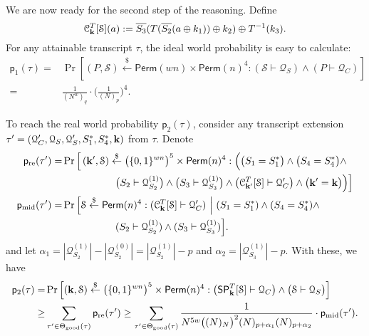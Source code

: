We are now ready for the second step of the reasoning. Define
%
$$\mathcal{C}_{\mathbf{k}}^T[\mathcal{S}](a):=   \overline{S_3}(T(\overline{S_2}(a\oplus k_1))\oplus k_2)\oplus T^{-1}(k_3).$$
%
For any attainable transcript $\tau$, the ideal world probability is easy to calculate:
%
%
\begin{align*}
\mathsf{p}_{1}(\tau)=&\operatorname{Pr}\left[(P,\mathcal{S})\stackrel{\$}{\leftarrow} {\mathsf{Perm}}(wn)\times\mathsf{Perm}(n)^4: (\mathcal{S} \vdash \mathcal{Q}_{S}) \wedge(P \vdash \mathcal{Q}_{C})  \right]		\\
=&\frac{1}{(N^w)_q}\cdot\bigg(\frac{1}{(N)_p}\bigg)^4.
\end{align*}



To reach the real world probability $\mathsf{p}_2(\tau)$, consider any transcript extension $\tau'=(\mathcal{Q}_{C}',\mathcal{Q}_{S},\mathcal{Q}_{S}',S_1^*,S_4^*,\mathbf{k})$ from $\tau$. Denote
%
%
\begin{align}
\mathsf{p}_{\mathrm{re}}(\tau') = & \operatorname{Pr}\Big[\left(\mathbf{k}',\mathcal{S}\right) \stackrel{\$}{\leftarrow} \big(\{0,1\}^{wn}\big)^5 \times \mathsf{Perm}(n)^4:
\Big(\big(S_1=S_1^*\big)\wedge\big(S_4=S_4^*\big)\wedge		\notag 	\\
&\ \ \ \ \ \ \ \ \ \ \ \ \ \ \ \ \big(S_2\vdash\mathcal{Q}_{S_2}^{(1)}\big)\wedge\big(S_3\vdash\mathcal{Q}_{S_3}^{(1)}\big)\wedge\big(\mathcal{C}_{\mathbf{k}'}^T[\mathcal{S}] \vdash \mathcal{Q}_C'\big)\wedge\big(\mathbf{k}'=\mathbf{k}\big)\Big)\Big]	 	\notag 	\\
\mathsf{p}_{\mathrm{mid}}(\tau') = & \operatorname{Pr}\Big[\mathcal{S} \stackrel{\$}{\leftarrow}\mathsf{Perm}(n)^4:(\mathcal{C}_{\mathbf{k}}^T[\mathcal{S}] \vdash \mathcal{Q}_C')~\Big|~
(S_1=S_1^*)\wedge (S_4=S_4^*)\wedge	 	\notag 	\\
&\ \ \ \ \ \ \ \ \ \ \ \ \ \ \ \  (S_2\vdash\mathcal{Q}_{S_2}^{(1)})\wedge (S_3\vdash\mathcal{Q}_{S_3}^{(1)})\Big].	 	\notag 	
\end{align}
%
%
%
and let $\alpha_1=|\mathcal{Q}_{S_2}^{(1)}|-|\mathcal{Q}_{S_2}^{(0)}|=|\mathcal{Q}_{S_2}^{(1)}|-p$ and $\alpha_2=|\mathcal{Q}_{S_3}^{(1)}|-p$. With these, we have
%
%
\begin{align*}
\mathsf{p}_2(\tau)=&\operatorname{Pr}\left[\left(\mathbf{k},\mathcal{S}\right) \stackrel{\$}{\leftarrow} \big(\{0,1\}^{wn}\big)^5 \times \mathsf{Perm}(n)^4:\big(\spn_{\bfk}^{T}[\mathcal{S}] \vdash \mathcal{Q}_{C}\big) \wedge \big(\mathcal{S} \vdash \mathcal{Q}_{S}\big)\right]		\\
\geq & \sum_{\tau^{\prime} \in \Theta_{\mathrm{good}}(\tau)} \mathsf{p}_{\mathrm{re}}(\tau')  
\geq
\sum_{\tau^{\prime} \in \Theta_{\mathrm{good}}(\tau)}
%
\frac{1}{N^{5w}\big((N)_{N}\big)^2(N)_{p+\alpha_1}(N)_{p+\alpha_2}}\cdot \mathsf{p}_{\mathrm{mid}}(\tau')  .
\end{align*}
